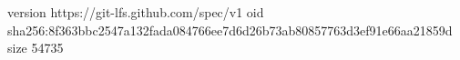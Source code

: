 version https://git-lfs.github.com/spec/v1
oid sha256:8f363bbc2547a132fada084766ee7d6d26b73ab80857763d3ef91e66aa21859d
size 54735
